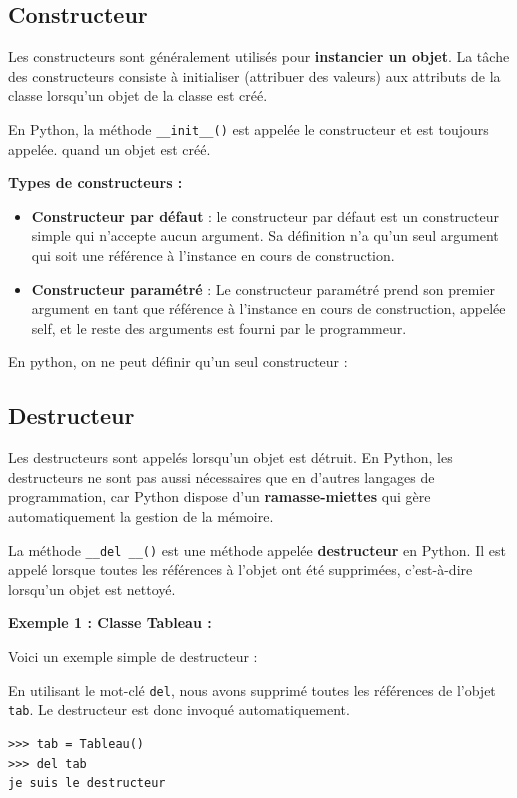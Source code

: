 \documentclass[a4paper,11pt]{article}
\theoremstyle{mytheor}
\begin{document}
\subsection{Constructeur}

Les constructeurs sont généralement utilisés pour \textbf{instancier un objet}. La tâche des constructeurs consiste à initialiser (attribuer des valeurs) aux attributs de la classe lorsqu'un objet de la classe est créé.

En Python, la méthode \Verb!__init__()! est appelée le constructeur et est toujours appelée. quand un objet est créé.

\textbf{Types de constructeurs :}

\begin{itemize}
	\item \textbf{Constructeur par défaut} : le constructeur par défaut est un constructeur simple qui n’accepte aucun argument. Sa définition n’a qu’un seul argument qui soit une référence à l’instance en cours de construction.
	
	\item \textbf{Constructeur paramétré} : Le constructeur paramétré prend son premier argument en tant que référence à l'instance en cours de construction, appelée self, et le reste des arguments est fourni par le programmeur.
\end{itemize}

\noindent
En python, on ne peut définir qu'un seul constructeur :


\noindent

\subsection{Destructeur}
Les destructeurs sont appelés lorsqu'un objet est détruit. En Python, les destructeurs ne sont pas aussi nécessaires que en d'autres langages de programmation, car Python dispose d'un \textbf{ramasse-miettes} qui gère automatiquement la gestion de la mémoire.

La méthode \Verb!__del __()! est une méthode appelée \textbf{destructeur} en Python. Il est appelé lorsque toutes les références à l’objet ont été supprimées, c’est-à-dire lorsqu’un objet est nettoyé.

\textbf{Exemple 1 : Classe Tableau :}

Voici un exemple simple de destructeur :

\noindent
En utilisant le mot-clé \texttt{del}, nous avons supprimé toutes les références de l’objet \texttt{tab}. Le destructeur est donc invoqué automatiquement.
\begin{Verbatim}[frame=leftline, framerule=1.5mm, rulecolor=\color{blue}]
>>> tab = Tableau()
>>> del tab
je suis le destructeur
\end{Verbatim}
\noindent
\end{document}
